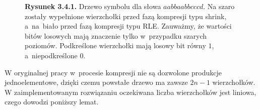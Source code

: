 \documentclass[declaration,shortabstract]{iithesis}
\theoremstyle{definition} \newtheorem{definition}{Definicja}[chapter]
\theoremstyle{remark} \newtheorem{remark}[definition]{Obserwacja}
\theoremstyle{plain} \newtheorem{theorem}[definition]{Twierdzenie}
\theoremstyle{remark} \newtheorem{example}{Przykład}[definition]
\theoremstyle{plain} \newtheorem{lemma}[definition]{Lemat}
\begin{document}
\begin{figure}[h]
    \begin{center}
        \caption*{\textbf{Rysunek 3.4.1.} Drzewo symbolu dla słowa $aabbaabbcccd$. Na szaro zostały wypełnione wierzchołki przed fazą kompresji typu shrink, a~na~biało przed fazą kompresji typu RLE. Zauważmy, że wartości bitów losowych mają znaczenie tylko w~przypadku szarych poziomów. Podkreślone wierzchołki mają losowy bit równy $1$, a~niepodkreślone $0$.}
    \end{center}
\end{figure}

W oryginalnej pracy w~procesie kompresji nie są dozwolone produkcje jednoelementowe, dzięki czemu powstałe drzewo ma zawsze $2n-1$ wierzchołków. W zaimplementowanym rozwiązaniu oczekiwana liczba wierzchołków jest liniowa, czego dowodzi poniższy lemat.
\end{document}
